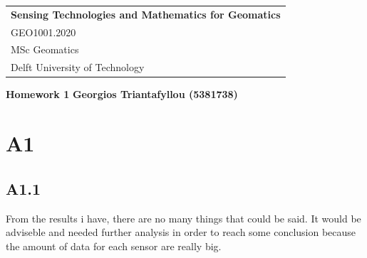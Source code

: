 \documentclass[a4paper,12pt]{article}
\begin{document}
	\thispagestyle{empty}
	\begin{tabular}{p{15.5cm}}
		{\large \bf Sensing Technologies and Mathematics for Geomatics} \\
		GEO1001.2020 \\ MSc Geomatics \\ Delft University of Technology \\
		\hline
	\end{tabular} 
\vspace*{0.3cm}
\begin{center}
	{\Large \bf Homework 1}
	\vspace{2mm}
	{\bf Georgios Triantafyllou (5381738)}
\end{center} 
\vspace{0.4cm}
\section{A1}
 \subsection{A1.1}
From the results i have, there are no many things that could be said. It would be adviseble and needed further analysis in order to reach some conclusion because the amount of data for each sensor are really big.
\end{document}
